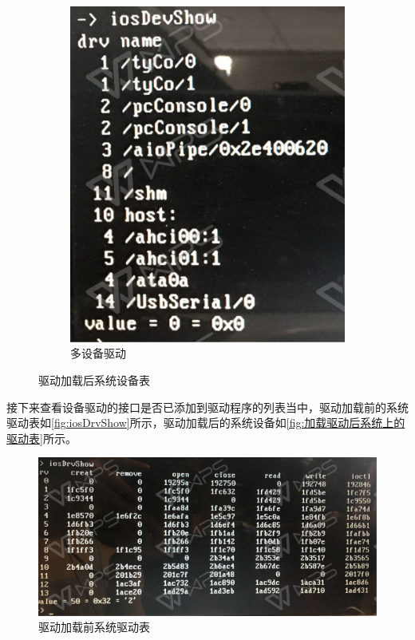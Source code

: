 \begin{figure}[h]
\begin{subfigure}[b]{0.4\textwidth}
  \includegraphics[width=\textwidth]{./graphics/iosDevShowM.pdf}
  \caption{多设备驱动}
  \end{subfigure}
\caption{驱动加载后系统设备表}\label{fig:加载驱动后系统上的设备表}
\end{figure}

\noindent 接下来查看设备驱动的接口是否已添加到驱动程序的列表当中，驱动加载前的系统驱动表如\autoref{fig:iosDrvShow}所示，驱动加载后的系统设备如\autoref{fig:加载驱动后系统上的驱动表}所示。
\begin{figure}[!h]
\centering
\includegraphics[width=.9\textwidth]{./graphics/iosDrvShow.pdf}
\caption{驱动加载前系统驱动表}\label{fig:iosDrvShow}
\end{figure}


